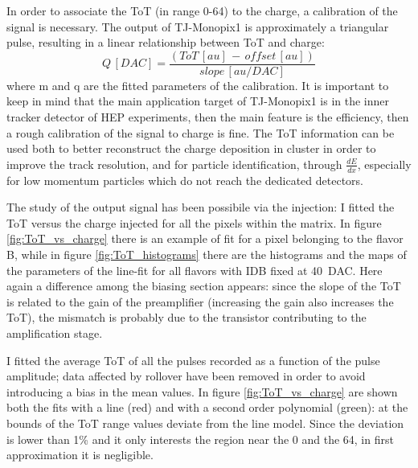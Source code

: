         In order to associate the ToT (in range 0-64) to the charge, a calibration of the signal is necessary. The output of TJ-Monopix1 is approximately a triangular pulse, resulting in a linear relationship between ToT and charge: 
        \begin{equation}
            Q\, [DAC] = \frac{(ToT\,[au]\, -\, offset\,[au])}{slope\, [au/DAC]} 
        \end{equation}\label{eq:calibration}
        where m and q are the fitted parameters of the calibration.
        It is important to keep in mind that the main application target of TJ-Monopix1 is in the inner tracker detector of HEP experiments, then the main feature is the efficiency, then a rough calibration of the signal to charge is fine. The ToT information can be used both to better reconstruct the charge deposition in cluster in order to improve the track resolution, and for particle identification, through $\frac{dE}{dx}$, especially for low momentum particles which do not reach the dedicated detectors.
                        
        The study of the output signal has been possibile via the injection: I fitted the ToT versus the charge injected for all the pixels within the matrix.
        In figure \ref{fig:ToT_vs_charge} there is an example of fit for a pixel belonging to the flavor B, while in figure \ref{fig:ToT_histograms} there are the histograms and the maps of the parameters of the line-fit for all flavors with IDB fixed at \SI{40}{DAC}. Here again a difference among the biasing section appears: since the slope of the ToT is related to the gain of the preamplifier (increasing the gain also increases the ToT), the mismatch is probably due to the transistor contributing to the amplification stage.

        I fitted the average ToT of all the pulses recorded as a function of the pulse amplitude; data affected by rollover have been removed in order to avoid introducing a bias in the mean values.
        In figure \ref{fig:ToT_vs_charge} are shown both the fits with a line (red) and with a second order polynomial (green): at the bounds of the ToT range values deviate from the line model. Since the deviation is lower than 1\% and it only interests the region near the 0 and the 64, in first approximation it is negligible. 



